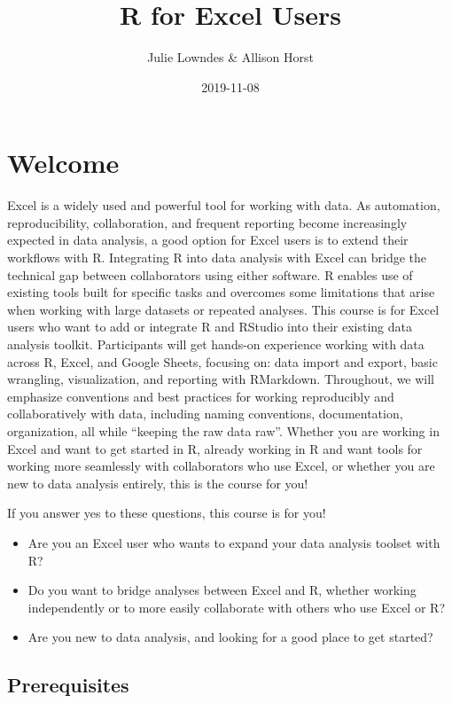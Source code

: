 \documentclass[]{book}
\title{R for Excel Users}
\author{Julie Lowndes \& Allison Horst}
\date{2019-11-08}
\providecommand{\tightlist}{%
  \setlength{\itemsep}{0pt}\setlength{\parskip}{0pt}}
\begin{document}
\maketitle

{
\setcounter{tocdepth}{1}
\tableofcontents
}
\hypertarget{welcome}{%
\chapter{Welcome}\label{welcome}}

Excel is a widely used and powerful tool for working with data. As automation, reproducibility, collaboration, and frequent reporting become increasingly expected in data analysis, a good option for Excel users is to extend their workflows with R. Integrating R into data analysis with Excel can bridge the technical gap between collaborators using either software. R enables use of existing tools built for specific tasks and overcomes some limitations that arise when working with large datasets or repeated analyses. This course is for Excel users who want to add or integrate R and RStudio into their existing data analysis toolkit. Participants will get hands-on experience working with data across R, Excel, and Google Sheets, focusing on: data import and export, basic wrangling, visualization, and reporting with RMarkdown. Throughout, we will emphasize conventions and best practices for working reproducibly and collaboratively with data, including naming conventions, documentation, organization, all while ``keeping the raw data raw''. Whether you are working in Excel and want to get started in R, already working in R and want tools for working more seamlessly with collaborators who use Excel, or whether you are new to data analysis entirely, this is the course for you!

If you answer yes to these questions, this course is for you!

\begin{itemize}
\tightlist
\item
  Are you an Excel user who wants to expand your data analysis toolset with R?
\item
  Do you want to bridge analyses between Excel and R, whether working independently or to more easily collaborate with others who use Excel or R?
\item
  Are you new to data analysis, and looking for a good place to get started?
\end{itemize}

\hypertarget{prerequisites}{%
\section{Prerequisites}\label{prerequisites}}
\end{document}
